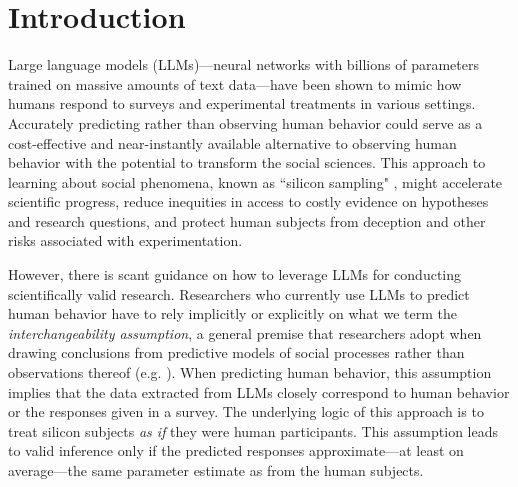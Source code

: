 \documentclass{article}
\title{\mytitle}
\date{\mydate}
\author{}
\begin{document}
\maketitle


\doublespacing

\myabstract

\clearpage
{}
\setcounter{1}


\section{Introduction}

Large language models (LLMs)---neural networks with billions of parameters trained on massive amounts of text data---have been shown to mimic how humans respond to surveys and experimental treatments in various settings. Accurately predicting rather than observing human behavior could serve as a cost-effective and near-instantly available alternative to observing human behavior with the potential to transform the social sciences. This approach to learning about social phenomena, known as ``silicon sampling" \citep{argyle_out_2023}, might accelerate scientific progress, reduce inequities in access to costly evidence on hypotheses and research questions, and protect human subjects from deception and other risks associated with experimentation. 

However, there is scant guidance on how to leverage LLMs for conducting scientifically valid research. Researchers who currently use LLMs to predict human behavior have to rely implicitly or explicitly on what we term the \textit{interchangeability assumption}, a general premise that researchers adopt when drawing conclusions from predictive models of social processes rather than observations thereof (e.g. \citealp{friedman_methodology_1953}). When predicting human behavior, this assumption implies that the data extracted from LLMs closely correspond to human behavior or the responses given in a survey. The underlying logic of this approach is to treat silicon subjects \textit{as if} they were human participants. This assumption leads to valid inference only if the predicted responses approximate---at least on average---the same parameter estimate as from the human subjects.
\end{document}
